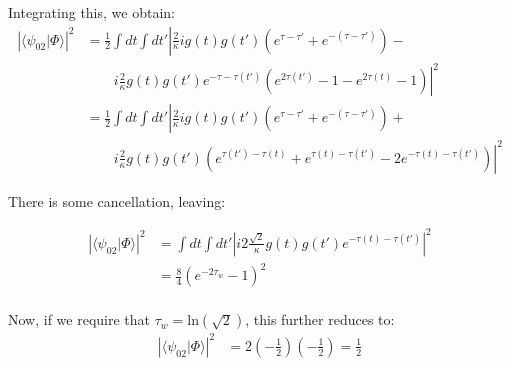 \documentclass[12pt]{article}
\begin{document}
Integrating this, we obtain:
\begin{align}
\left | \langle \psi_{02} | \Phi \rangle \right | ^2 & = \frac{1}{2}\int dt \int dt'\left | \frac{2}{\kappa} i g(t) g(t') \left(e^{\tau-\tau'} +e^{-(\tau-\tau')}\right) -\right.\\
&\qquad \left.i \frac{2}{\kappa}g(t) g(t') e^{-\tau-\tau(t')}\left( e^{2\tau(t')}-1 - e^{2\tau(t)}-1 \right) \right |^2 \\
 &=  \frac{1}{2}\int dt \int dt'\left | \frac{2}{\kappa} i g(t) g(t') \left(e^{\tau-\tau'} +e^{-(\tau-\tau')}\right) +\right.\\
&\qquad \left.i \frac{2}{\kappa}g(t) g(t') \left( e^{\tau(t')-\tau(t)} + e^{\tau(t)-\tau(t')}-2e^{-\tau(t)-\tau(t')} \right) \right |^2
\end{align}

There is some cancellation, leaving:

\begin{align}
\left | \langle \psi_{02} | \Phi \rangle \right | ^2 & =\int dt \int dt'\left |i 2\frac{\sqrt{2}}{\kappa} g(t)g(t') e^{-\tau(t)-\tau(t')} \right|^2 \\
&= \frac{8}{4} \left ( e^{-2\tau_w}-1\right)^2\\
\end{align}

Now, if we require that $\tau_w = \textrm{ln}(\sqrt{2})$, this further reduces to:
\begin{align}
\left | \langle \psi_{02} | \Phi \rangle \right | ^2 &=2(-\frac{1}{2})(-\frac{1}{2})=\frac{1}{2}
\end{align}
\end{document}
